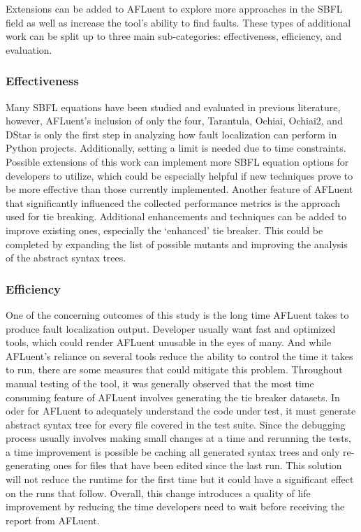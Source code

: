 Extensions can be added to AFLuent to explore more approaches in the
SBFL field as well as increase the tool's ability to find faults. These
types of additional work can be split up to three main sub-categories:
effectiveness, efficiency, and evaluation.

\subsubsection{Effectiveness}

Many SBFL equations have been studied and evaluated in previous literature,
however, AFLuent's inclusion of only the four, Tarantula, Ochiai, Ochiai2, and
DStar is only the first step in analyzing how fault localization can perform in
Python projects. Additionally, setting a limit is needed due to time
constraints. Possible extensions of this work can implement more SBFL equation
options for developers to utilize, which could be especially helpful if new
techniques prove to be more effective than those currently implemented. Another
feature of AFLuent that significantly influenced the collected performance
metrics is the approach used for tie breaking. Additional enhancements and
techniques can be added to improve existing ones, especially the `enhanced' tie
breaker. This could be completed by expanding the list of possible mutants and
improving the analysis of the abstract syntax trees.

\subsubsection{Efficiency}

One of the concerning outcomes of this study is the long time AFLuent takes to
produce fault localization output. Developer usually want fast and optimized
tools, which could render AFLuent unusable in the eyes of many. And while
AFLuent's reliance on several tools reduce the ability to control the time it
takes to run, there are some measures that could mitigate this problem.
Throughout manual testing of the tool, it was generally observed that the most
time consuming feature of AFLuent involves generating the tie breaker datasets.
In oder for AFLuent to adequately understand the code under test, it must
generate abstract syntax tree for every file covered in the test suite. Since
the debugging process usually involves making small changes at a time and
rerunning the tests, a time improvement is possible be caching all generated
syntax trees and only re-generating ones for files that have been edited since
the last run. This solution will not reduce the runtime for the first time but
it could have a significant effect on the runs that follow. Overall, this change
introduces a quality of life improvement by reducing the time developers need to
wait before receiving the report from AFLuent.

